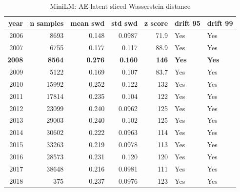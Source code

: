\begin{table}[ht]
\centering
\caption{MiniLM: AE-latent sliced Wasserstein distance}
\label{tab:minilm_latent_swd}
\begin{tabular}{rrrrrll}
\toprule
year & n samples & mean swd & std swd & z score & drift 95 & drift 99 \\
\midrule
2006 & 8693 & 0.148 & 0.0987 & 71.9 & Yes & Yes \\
2007 & 6755 & 0.177 & 0.117 & 88.9 & Yes & Yes \\
\textbf{2008} & \textbf{8564} & \textbf{0.276} & \textbf{0.160} & \textbf{146} & \textbf{Yes} & \textbf{Yes} \\
2009 & 5122 & 0.169 & 0.107 & 83.7 & Yes & Yes \\
2010 & 15992 & 0.252 & 0.122 & 132 & Yes & Yes \\
2011 & 17814 & 0.235 & 0.104 & 122 & Yes & Yes \\
2012 & 23099 & 0.240 & 0.0962 & 125 & Yes & Yes \\
2013 & 29003 & 0.240 & 0.102 & 125 & Yes & Yes \\
2014 & 30602 & 0.222 & 0.0963 & 114 & Yes & Yes \\
2015 & 33263 & 0.219 & 0.0978 & 113 & Yes & Yes \\
2016 & 28573 & 0.231 & 0.120 & 120 & Yes & Yes \\
2017 & 38648 & 0.216 & 0.0981 & 111 & Yes & Yes \\
2018 & 375 & 0.237 & 0.0976 & 123 & Yes & Yes \\
\bottomrule
\end{tabular}
\end{table}

